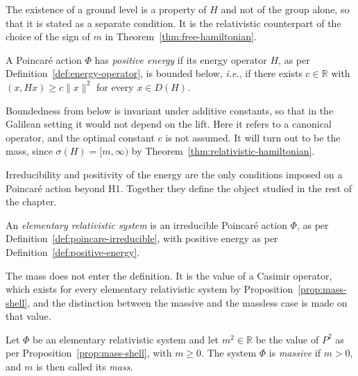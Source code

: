 The existence of a ground level is a property of $H$ and not of the group alone, so that it is stated as a separate condition. It is the relativistic counterpart of the choice of the sign of $m$ in Theorem~\ref{thm:free-hamiltonian}.

\begin{definition}\label{def:positive-energy}
	A Poincar\'e action $\Phi$ has \emph{positive energy} if its energy operator $H$, as per Definition~\ref{def:energy-operator}, is bounded below, \textit{i.e.}, if there exists $c\in\mathbb{R}$ with $(x,Hx)\geq c\|x\|^2$ for every $x\in D(H)$.
\end{definition}

\begin{remark}
	Boundedness from below is invariant under additive constants, so that in the Galilean setting it would not depend on the lift. Here it refers to a canonical operator, and the optimal constant $c$ is not assumed. It will turn out to be the mass, since $\sigma(H)=[m,\infty)$ by Theorem~\ref{thm:relativistic-hamiltonian}.
\end{remark}

Irreducibility and positivity of the energy are the only conditions imposed on a Poincar\'e action beyond H1. Together they define the object studied in the rest of the chapter.

\begin{definition}\label{def:elementary-system}
	An \emph{elementary relativistic system} is an irreducible Poincar\'e action $\Phi$, as per Definition~\ref{def:poincare-irreducible}, with positive energy as per Definition~\ref{def:positive-energy}.
\end{definition}

The mass does not enter the definition. It is the value of a Casimir operator, which exists for every elementary relativistic system by Proposition~\ref{prop:mass-shell}, and the distinction between the massive and the massless case is made on that value.

\begin{definition}\label{def:massive-system}
	Let $\Phi$ be an elementary relativistic system and let $m^2\in\mathbb{R}$ be the value of $P^2$ as per Proposition~\ref{prop:mass-shell}, with $m\geq0$. The system $\Phi$ is \emph{massive} if $m>0$, and $m$ is then called its \emph{mass}.
\end{definition}

